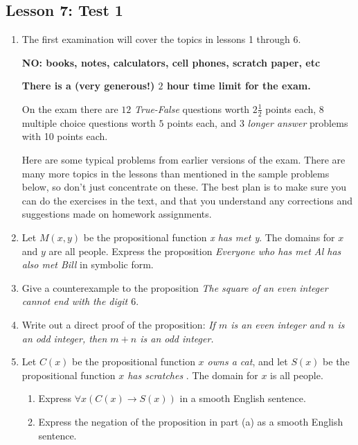 \documentclass[11pt]{amsart}
\begin{document}
\subsection{Lesson 7: Test 1}

\vskip 5pt

\begin{enumerate}

\item[]

\centerline{The first examination will cover the topics in lessons 1 through 6.}
\medskip
\centerline{\bf NO: books, notes, calculators, cell phones, scratch paper, etc}
\medskip
\centerline{\bf There is a (very generous!) $2$ hour time limit for the exam.}
\medskip

On the exam there are $12$ {\it True-False} questions worth $2\frac{1}{2}$ points each, 
$8$ multiple choice questions worth $5$ points each, and $3$ {\it longer answer} 
problems with 10 points each. 

Here are some typical problems from earlier versions of the exam.
There are many more topics in the lessons than mentioned in the
sample problems below, so don't just concentrate on these. The
best plan is to make sure you can do the exercises in the text, and
that you understand any corrections and suggestions made on homework
assignments. 

\medskip 


\item Let $M(x,y)$ be the propositional function {\it x has met y}.
The domains for $x$ and $y$ are all people.
Express the proposition {\it Everyone who has met Al has also
met Bill} in symbolic form.
\medskip 

\item Give a counterexample to the proposition {\it The square of an
even integer cannot end with the digit $6$}.
\medskip 
\item  Write out a direct proof of the proposition: {\it If $m$ is an even integer and $n$ is an
odd integer, then $m+n$ is an odd integer.}

\medskip 
\item Let $C(x)$ be the propositional function {\it $x$ owns a cat}, and let
$S(x)$ be the propositional function {\it $x$ has scratches }. The domain for $x$ is all
people.
\begin{enumerate}
\item Express $\forall{x}(C(x)\rightarrow S(x))$ in a smooth English sentence.

\item Express the negation of the proposition in part (a) as a smooth English sentence.
\end{enumerate}


\end{enumerate}
\end{document}
